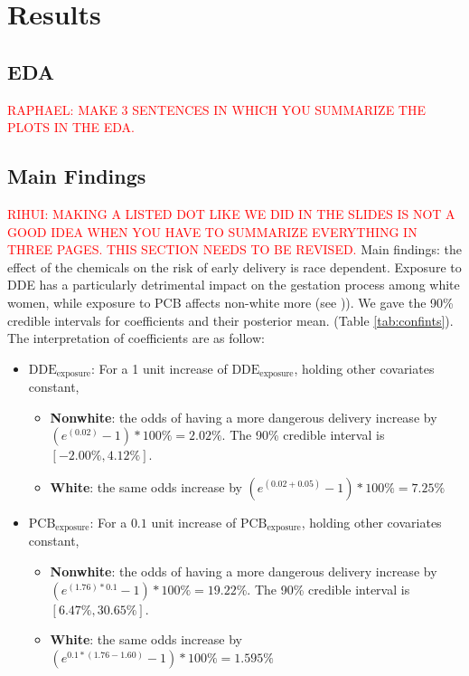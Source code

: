 \documentclass[wcp]{jmlr}%
\begin{document}
\section{Results}
\label{sec:results}

\subsection{EDA}
\textcolor{red}{RAPHAEL: MAKE 3 SENTENCES IN WHICH YOU SUMMARIZE THE PLOTS IN THE EDA.}



\subsection{Main Findings}
\textcolor{red}{RIHUI: MAKING A LISTED DOT LIKE WE DID IN THE SLIDES IS NOT A GOOD IDEA WHEN YOU HAVE TO SUMMARIZE EVERYTHING IN THREE PAGES. THIS SECTION NEEDS TO BE REVISED.}
Main findings: the effect of the chemicals on the risk of early delivery is race dependent. Exposure to DDE has a particularly detrimental impact on the gestation process among white women, while exposure to PCB affects non-white more (see )).
We gave the 90\% credible intervals for coefficients and their posterior mean. (Table \ref{tab:confints}). The interpretation of coefficients are as follow:
\begin{itemize}
	\item $\text{DDE}_{\text{exposure}}$: For a 1 unit increase of $\text{DDE}_{\text{exposure}}$, holding other covariates constant,
		    \begin{itemize}
		    	\item \textbf{Nonwhite}: the odds of having a more dangerous delivery increase by $(e^{(0.02)}-1)*100\%=2.02\%$. The 90\% credible interval is $[-2.00\%, 4.12\%]$.
		    	\item \textbf{White}:  the same odds increase by $(e^{(0.02+0.05)}-1)*100\%=7.25\%$
		    \end{itemize}
	\item $\text{PCB}_{\text{exposure}}$: For a $0.1$ unit increase of $\text{PCB}_{\text{exposure}}$, holding other covariates constant,
			\begin{itemize}
				\item \textbf{Nonwhite}: the odds of having a more dangerous delivery increase by $(e^{(1.76)*0.1}-1)*100\%=19.22\%$. The 90\% credible interval is $[6.47\%,30.65\%]$.
				\item \textbf{White}:  the same odds increase by $(e^{0.1*(1.76-1.60)}-1)*100\%=1.595\%$
			\end{itemize}
\end{itemize}
\end{document}
